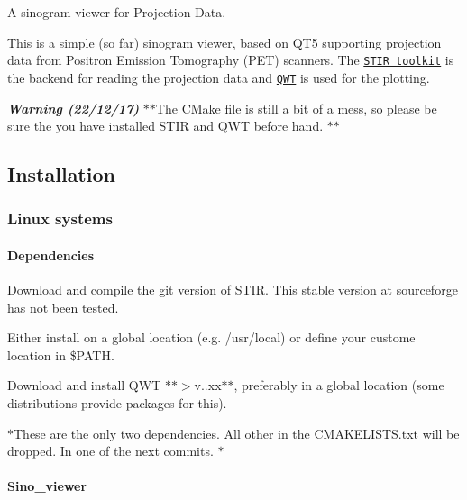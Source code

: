 A sinogram viewer for Projection Data.

This is a simple (so far) sinogram viewer, based on Q\+T5 supporting projection data from Positron Emission Tomography (P\+ET) scanners. The \href{https://github.com/UCL/STIR}{\tt S\+T\+IR toolkit} is the backend for reading the projection data and \href{http://qwt.sourceforge.net/}{\tt Q\+WT} is used for the plotting.



{\itshape {\bfseries Warning (22/12/17)}} $\ast$$\ast$\+The C\+Make file is still a bit of a mess, so please be sure the you have installed S\+T\+IR and Q\+WT before hand. $\ast$$\ast$

\subsection*{Installation}

\subsubsection*{Linux systems}

\paragraph*{Dependencies}


\begin{DoxyEnumerate}
\item Download and compile the git version of S\+T\+IR. This stable version at sourceforge has not been tested.
\item Either install on a global location (e.\+g. {\ttfamily /usr/local}) or define your custome location in {\ttfamily \$\+P\+A\+TH}.
\item Download and install Q\+WT $\ast$$\ast$$>$v..\+xx$\ast$$\ast$, preferably in a global location (some distributions provide packages for this).
\end{DoxyEnumerate}

$\ast$\+These are the only two dependencies. All other in the C\+M\+A\+K\+E\+L\+I\+S\+T\+S.\+txt will be dropped. In one of the next commits. $\ast$ \paragraph*{Sino\+\_\+viewer}


